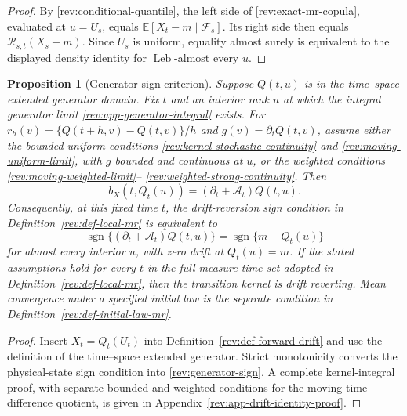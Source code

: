 \documentclass[11pt]{article}
\newtheorem{proposition}[definition]{Proposition}
\theoremstyle{remark}
\newcommand{\E}{\mathbb E}
\newcommand{\sgn}{\operatorname{sgn}}
\newcommand{\Leb}{\operatorname{Leb}}
\begin{document}
\begin{proof}
By \eqref{rev:conditional-quantile}, the left side of
\eqref{rev:exact-mr-copula}, evaluated at $u=U_s$, equals
$\E[X_t-m\mid\mathcal F_s]$.  Its right side then equals
$\mathcal R_{s,t}(X_s-m)$.  Since $U_s$ is uniform, equality almost surely is
equivalent to the displayed density identity for $\Leb$-almost every $u$.
\end{proof}

\begin{proposition}[Generator sign criterion]
\label{rev:prop-generator-sign}
Suppose $Q(t,u)$ is in the time--space extended generator domain.  Fix $t$ and
an interior rank $u$ at which the integral generator limit
\eqref{rev:app-generator-integral} exists.  For
$r_h(v)=\{Q(t+h,v)-Q(t,v)\}/h$ and
$g(v)=\partial_tQ(t,v)$, assume either the bounded uniform conditions
\eqref{rev:kernel-stochastic-continuity} and
\eqref{rev:moving-uniform-limit}, with $g$ bounded and continuous at $u$, or
the weighted conditions \eqref{rev:moving-weighted-limit}--
\eqref{rev:weighted-strong-continuity}.  Then
\begin{equation}
b_X(t,Q_t(u))=(\partial_t+\mathcal A_t)Q(t,u).
\label{rev:drift-quantile-generator}
\end{equation}
Consequently, at this fixed time $t$, the drift-reversion sign condition in
Definition~\ref{rev:def-local-mr} is equivalent to
\begin{equation}
\sgn\{(\partial_t+\mathcal A_t)Q(t,u)\}
=\sgn\{m-Q_t(u)\}
\label{rev:generator-sign}
\end{equation}
for almost every interior $u$, with zero drift at $Q_t(u)=m$.  If the stated
assumptions hold for every $t$ in the full-measure time set adopted in
Definition~\ref{rev:def-local-mr}, then the transition kernel is drift
reverting.  Mean convergence under a specified initial law is the separate
condition in Definition~\ref{rev:def-initial-law-mr}.
\end{proposition}

\begin{proof}
Insert $X_t=Q_t(U_t)$ into Definition~\ref{rev:def-forward-drift} and use the
definition of the time--space extended generator.  Strict monotonicity converts
the physical-state sign condition into \eqref{rev:generator-sign}.
A complete kernel-integral proof, with separate bounded and weighted conditions
for the moving time difference quotient, is given in
Appendix~\ref{rev:app-drift-identity-proof}.
\end{proof}
\end{document}
